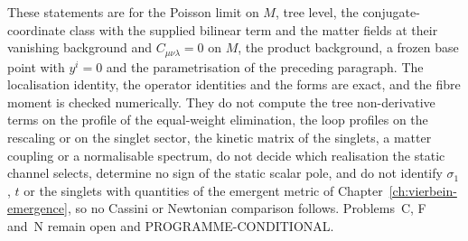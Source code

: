 These statements are for the Poisson limit on \(M\), tree level, the conjugate-coordinate class with the supplied bilinear term and the matter fields at their vanishing background and \(C_{\mu\nu\lambda}=0\) on \(M\), the product background, a frozen base point with \(y^i=0\) and the parametrisation of the preceding paragraph. The localisation identity, the operator identities and the forms are exact, and the fibre moment is checked numerically. They do not compute the tree non-derivative terms on the profile of the equal-weight elimination, the loop profiles on the rescaling or on the singlet sector, the kinetic matrix of the singlets, a matter coupling or a normalisable spectrum, do not decide which realisation the static channel selects, determine no sign of the static scalar pole, and do not identify \(\sigma_1\), \(t\) or the singlets with quantities of the emergent metric of Chapter~\ref{ch:vierbein-emergence}, so no Cassini or Newtonian comparison follows. Problems~C, F and~N remain open and PROGRAMME-CONDITIONAL.

